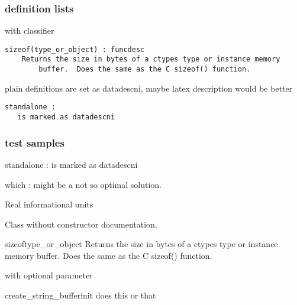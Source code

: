 \subsubsection{definition lists\label{-definition-lists}}

with classifier
\begin{verbatim}
sizeof(type_or_object) : funcdesc
    Returns the size in bytes of a ctypes type or instance memory
        buffer.  Does the same as the C sizeof() function.
\end{verbatim}

plain definitions are set as datadescni, maybe latex description would
be better
\begin{verbatim}
standalone :
   is marked as datadescni
\end{verbatim}


\subsubsection{test samples\label{-test-samples}}

\begin{datadescni}{standalone :}
is marked as datadescni
\end{datadescni}

\begin{datadescni}{which :}
might be a not so optimal solution.
\end{datadescni}

Real informational units

\begin{classdesc*}{Class}
without constructor documentation.
\end{classdesc*}

\begin{funcdesc}{sizeof}{type_or_object}
Returns the size in bytes of a ctypes type or instance memory
buffer.  Does the same as the C sizeof() function.
\end{funcdesc}

with optional parameter

\begin{funcdesc}{create_string_buffer}{init}
does this or that
\end{funcdesc}


